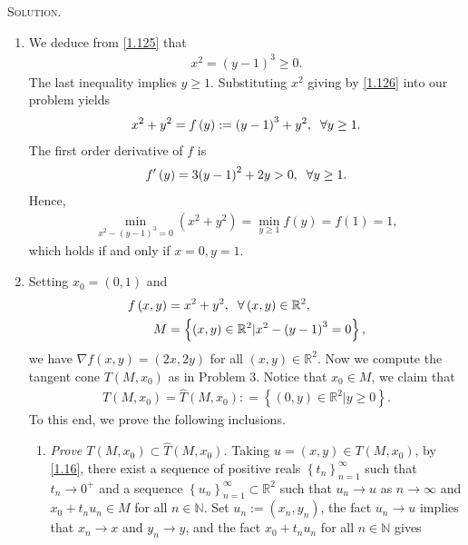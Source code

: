 \documentclass[a4paper]{article}
\numberwithin{equation}{section}
\begin{document}
\textsc{Solution.} 
\begin{enumerate}
\item We deduce from \eqref{1.125} that 
\begin{align}
\label{1.126}
{x^2} = {\left( {y - 1} \right)^3} \ge 0.
\end{align}
The last inequality implies $y\ge 1$. Substituting $x^2$ giving by \eqref{1.126} into our problem yields
\begin{align}
{x^2} + {y^2} = f\left( y \right): = {\left( {y - 1} \right)^3} + {y^2},\hspace{0.2cm}\forall y \ge 1.
\end{align}
The first order derivative of $f$ is 
\begin{align}
f'\left( y \right) = 3{\left( {y - 1} \right)^2} + 2y > 0,\hspace{0.2cm}\forall y \ge 1.
\end{align}
Hence,
\begin{align}
\mathop {\min }\limits_{{x^2} - {{\left( {y - 1} \right)}^3} = 0} \left( {{x^2} + {y^2}} \right) = \mathop {\min }\limits_{y \ge 1} f\left( y \right) = f\left( 1 \right) = 1,
\end{align}
which holds if and only if $x=0,y=1$. 
\item Setting $x_0=\left(0,1\right)$ and
\begin{align}
f\left( {x,y} \right) &= {x^2} + {y^2},\hspace{0.2cm}\forall \left( {x,y} \right) \in {\mathbb{R}^2},\\
M &= \left\{ {\left( {x,y} \right) \in {\mathbb{R}^2}|{x^2} - {{\left( {y - 1} \right)}^3} = 0} \right\},
\end{align}
we have $\nabla f\left( {x,y} \right) = \left( {2x,2y} \right)$ for all $\left(x,y\right) \in \mathbb{R}^2$. Now we compute the tangent cone $T\left(M,x_0\right)$ as in Problem 3. Notice that $x_0\in M$, we claim that
\begin{align}
\label{1.132}
T\left( {M,{x_0}} \right) = \widehat T\left( {M,{x_0}} \right): = \left\{ {\left( {0,y} \right) \in {\mathbb{R}^2}|y \ge 0} \right\}.
\end{align}
To this end, we prove the following inclusions.
\begin{enumerate}
\item \textit{Prove $T\left( {M,{x_0}} \right) \subset \widehat T\left( {M,{x_0}} \right)$.} Taking $u=\left(x,y\right) \in T\left(M,x_0\right)$, by \eqref{1.16}, there exist a sequence of positive reals $\left\{ {{t_n}} \right\}_{n = 1}^\infty $ such that $t_n\to 0^+$ and a sequence $\left\{ {{u_n}} \right\}_{n = 1}^\infty  \subset {\mathbb{R}^2}$ such that $u_n\to u$ as $n\to \infty$ and $x_0+t_nu_n \in M$ for all $n\in \mathbb{N}$. Set $u_n:=\left(x_n,y_n\right)$, the fact $u_n\to u$ implies that $x_n\to x$ and $y_n \to y$, and the fact $x_0+t_nu_n$ for all $n\in \mathbb{N}$ gives

\end{enumerate}
\end{enumerate}
\end{document}
